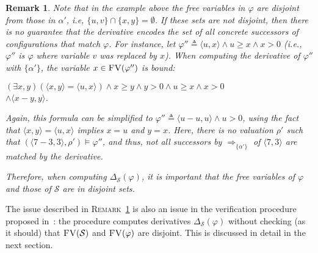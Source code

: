 \documentclass[conference]{IEEEtran}
\newenvironment{todo}{\medskip\hrule\smallskip\noindent}{\smallskip\hrule\medskip}
\newcommand{\dl}[1]{\begin{todo}\textcolor{blue}{Dorel:}\\ \color{red}{#1}\color{black}\end{todo}}
\newcommand{\vr}[1]{\begin{todo}\textcolor{blue}{Vlad:}\\ \color{orange}{#1}\color{black}\end{todo}}
\newcommand{\dl}[1]{}
\newcommand{\vr}[1]{}
\newcommand{\eqbydef}{\triangleq}
\renewcommand{\S}{\mathcal{S}}
\newcommand{\tran}[2]{\Ra^{\!#1}_{\!#2}}
\newcommand{\Ra}{\Rightarrow}
\newcommand{\FreeVars}{\mathit{\textsc{FV}}}
\newtheorem{remark}{Remark}
\begin{document}
\begin{remark}
\label{rem:der}
Note that in the example above the free variables in $\varphi$  are disjoint from those in $\alpha'$, i.e, $\{ u, v \} \cap \{ x, y \} = \emptyset$.
If these sets are not disjoint, then there is no guarantee that the derivative encodes the set of all concrete successors of configurations that match $\varphi$.
For instance, let $\varphi'' \eqbydef \langle u, x \rangle \land u \geq x \land x > 0$ (i.e.,  $\varphi''$ is $\varphi$ where variable $v$ was replaced by $x$).
When computing the derivative of $\varphi''$ with $\{\alpha'\}$, the variable $x \in \FreeVars(\varphi'')$ is bound:\vspace{1ex}

\noindent
$(\exists x, y) (\langle x , y \rangle = \langle u, x \rangle)  \land x \geq y \land y > 0 \land  u \geq x \land x > 0$\\
\hspace*{6.8cm}$\land \langle x - y, y \rangle$.

\vspace{1ex}
\noindent
Again, this formula can be simplified to $\varphi''\eqbydef\langle u - u, u \rangle \land u > 0$,
using the fact that $\langle x , y \rangle = \langle u, x \rangle$ implies $x = u$ and $y = x$.
Here, there is no valuation $\rho'$ such that $(\langle 7 - 3, 3 \rangle, \rho') \models \varphi''$, and thus, 
not all successors by $\tran{}{\{\alpha'\}}$ of $\langle 7, 3 \rangle$ are matched by the derivative.

Therefore, when computing $\Delta_\S(\varphi)$, it is important that the free variables of $\varphi$ and those of $\S$ are in disjoint sets. 
\end{remark}

The issue described in \textsc{Remark}~\ref{rem:der} is also an issue in the verification procedure proposed in~\cite{lucanu-rusu-arusoaie-nowak-LRC2015}: the procedure computes derivatives $\Delta_\S(\varphi)$ without checking (as it should) that $\FreeVars(\S)$ and $\FreeVars(\varphi)$ are disjoint.
This is discussed in detail in the next section.

\end{document}

